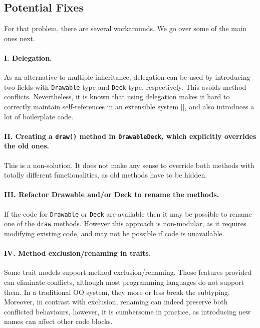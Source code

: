 \subsection{Potential Fixes}

For that problem, there are several workarounds. We go over some of
the main ones next.

\paragraph{I. Delegation.} As an alternative to multiple inheritance,
delegation can be used by introducing two fields with
\lstinline|Drawable| type and \lstinline|Deck| type,
respectively. This avoids method conflicts. Nevertheless, it is known
that using delegation makes it hard to correctly maintain
self-references  in an extensible system [], and also
introduces a lot of boilerplate code.

\paragraph{II. Creating a \lstinline|draw()| method in \lstinline|DrawableDeck|, which explicitly overrides the old ones.}
This is a non-solution. It does not make any sense to override both methods with totally different functionalities, as old
methods have to be hidden.

\paragraph{III. Refactor Drawable and/or Deck to rename the methods.} If
the code for \lstinline|Drawable| or \lstinline|Deck| are available
then it may be possible to rename one of the \lstinline|draw|
methods. However this approach is non-modular, as it requires 
modifying existing code, and may not be possible if code is unavailable.


\paragraph{IV. Method exclusion/renaming in traits.} Some trait models
support method exclusion/renaming. Those features
provided can eliminate conflicts, although most
programming languages do not support them. In a traditional OO system,
they more or less break the subtyping. Moreover, in
contrast with exclusion, renaming can indeed preserve both conflicted
behaviours, however, it is cumbersome in practice, as introducing new
names can affect other code blocks. \\

